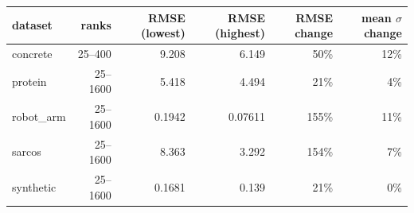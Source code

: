 \begin{tabular}{lrrrrr}
\toprule
dataset & ranks & RMSE (lowest) & RMSE (highest) & RMSE change & mean $\sigma$ change \\
\midrule
concrete & 25--400 & 9.208 & 6.149 & 50\% & 12\% \\
protein & 25--1600 & 5.418 & 4.494 & 21\% & 4\% \\
robot\_arm & 25--1600 & 0.1942 & 0.07611 & 155\% & 11\% \\
sarcos & 25--1600 & 8.363 & 3.292 & 154\% & 7\% \\
synthetic & 25--1600 & 0.1681 & 0.139 & 21\% & 0\% \\
\bottomrule
\end{tabular}
